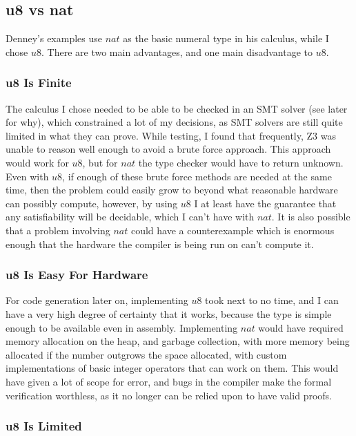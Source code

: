 \subsection{u8 vs nat}

Denney's examples use $nat$ as the basic numeral type in his calculus, while I chose $u8$.
There are two main advantages, and one main disadvantage to $u8$.

\subsubsection{u8 Is Finite}

The calculus I chose needed to be able to be checked in an SMT solver (see later for why), which
constrained a lot of my decisions, as SMT solvers are still quite limited in what they can prove.
While testing, I found that frequently, Z3 was unable to reason well enough to avoid a brute force
approach.
This approach would work for $u8$, but for $nat$ the type checker would have to return unknown.
Even with $u8$, if enough of these brute force methods are needed at the same time, then the problem could easily
grow to beyond what reasonable hardware can possibly compute, however, by using $u8$ I at least
have the guarantee that any satisfiability will be decidable, which I can't have with $nat$.
It is also possible that a problem involving $nat$ could have a counterexample which is enormous
enough that the hardware the compiler is being run on can't compute it.

\subsubsection{u8 Is Easy For Hardware}

For code generation later on, implementing $u8$ took next to no time, and I can have a very high
degree of certainty that it works, because the type is simple enough to be available even in
assembly.
Implementing $nat$ would have required memory allocation on the heap, and garbage collection,
with more memory being allocated if the number outgrows the space allocated, with custom
implementations of basic integer operators that can work on them.
This would have given a lot of scope for error, and bugs in the compiler make the formal verification
worthless, as it no longer can be relied upon to have valid proofs.

\subsubsection{u8 Is Limited}

